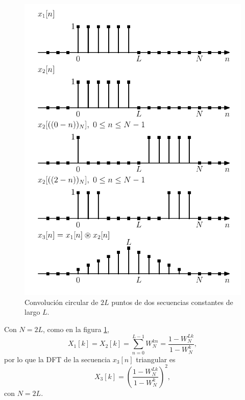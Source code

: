 \documentclass[a4paper]{report}
\begin{document}
\begin{figure}[!htb]
  \begin{minipage}[c]{0.57\textwidth}
    \includegraphics[width=\textwidth]{figuras/dft_properties_circular_convolution_two_impulses.pdf}
  \end{minipage}\hfill
  \begin{minipage}[c]{0.33\textwidth}
    \caption{
      Convolución circular de \(2L\) puntos de dos secuencias constantes de largo \(L\).
    }\label{fig:dft_properties_circular_convolution_two_impulses}
  \end{minipage}
\end{figure}
Con \(N=2L\), como en la figura \ref{fig:dft_properties_circular_convolution_two_impulses},
\[
 X_1[k]=X_2[k]=\sum_{n=0}^{L-1}W_N^{kn}=\frac{1-W_N^{Lk}}{1-W_N^{k}},
\]
por lo que la DFT de la secuencia \(x_3[n]\) triangular es 
\[
 X_3[k]=\left(\frac{1-W_N^{Lk}}{1-W_N^{k}}\right)^2,
\]
con \(N=2L\).
\end{document}
